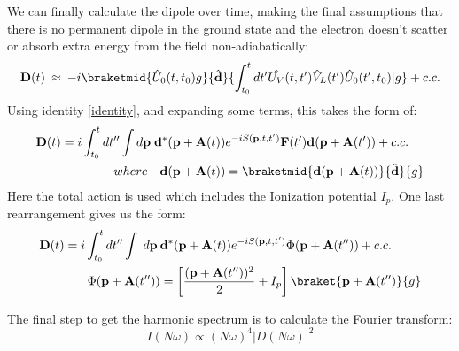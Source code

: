 \documentclass[11pt,a4paper]{report}
\begin{document}
We can finally calculate the dipole over time, making the final assumptions that there is no permanent dipole in the ground state and the electron doesn't scatter or absorb extra energy from the field non-adiabatically:
\begin{equation}
\mathbf{D}(t) \: \approx \: -i\braketmid{\hat{U}_0 (t,t_0)g}{\hat{\mathbf{d}}}{\int^{t}_{t_0} dt' \hat{U_V}(t,t') \hat{V}_L(t') \hat{U}_0(t',t_0) \vert g} + c.c.
\end{equation}
Using identity \eqref{identity}, and expanding some terms, this takes the form of:
\begin{equation}
\begin{split}
\mathbf{D}(t) = i\int^{t}_{t_0} dt'' \int d\mathbf{p}\; \mathbf{d}^*(\mathbf{p} + \mathbf{A}(t))& e^{-iS(\mathbf{p},t,t')} \mathbf{F}(t') \mathbf{d} (\mathbf{p} + \mathbf{A}(t')) + c.c. \\
where \quad \mathbf{d}(\mathbf{p} + \mathbf{A}(t)) &= \braketmid{\mathbf{d}(\mathbf{p} + \mathbf{A}(t))}{\hat{\mathbf{d}}}{g}
\end{split}
	\label{analitical}
\end{equation}
Here the total action is used which includes the Ionization potential $I_p$. One last rearrangement gives us the form:
\begin{equation}
\begin{split}
\mathbf{D}(t) = i\int^{t}_{t_0}dt''\int \; d\mathbf{p} \: &\mathbf{d}^*  (\mathbf{p} + \mathbf{A}(t)) e^{-iS(\mathbf{p},t,t')} \Phi ( \mathbf{p} + \mathbf{A}(t'')) + c.c. \\
\Phi ( \mathbf{p} + \mathbf{A}(t'')) & = \left[\frac{(\mathbf{p} + \mathbf{A}(t''))^2}{2} + I_p\right]\braket{\mathbf{p} + \mathbf{A}(t'')}{g}
\end{split}
\end{equation} 

The final step to get the harmonic spectrum is to calculate the Fourier transform:
\begin{equation}
I(N\omega) \propto (N\omega)^4 \vert D(N\omega) \vert ^2
\end{equation}
\newpage
\end{document}
